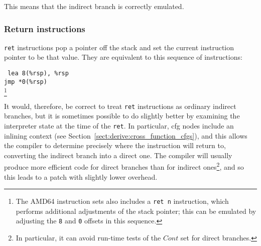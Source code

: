 This means that the indirect branch is correctly
emulated.




\subsubsection{Return instructions}

\texttt{ret} instructions pop a pointer off the stack and set the
current instruction pointer to be that value.  They are equivalent to
this sequence of instructions:

{\tt
lea 8(\%rsp), \%rsp\\
jmp *0(\%rsp)\\
}\footnote{The AMD64 instruction sets also includes a \texttt{ret n} instruction, which performs additional adjustments of the stack pointer; this can be emulated by adjusting the \texttt{8} and \texttt{0} offsets in this sequence.}

It would, therefore, be correct to treat \texttt{ret} instructions as
ordinary indirect branches, but it is sometimes possible to do
slightly better by examining the interpreter state at the time of the
\texttt{ret}.  In particular, \gls{cfg} nodes include an inlining context
(see Section~\ref{sect:derive:cross_function_cfgs}), and this allows
the compiler to determine precisely where the instruction will return
to, converting the indirect branch into a direct one.  The compiler
will usually produce more efficient code for direct branches than for
indirect ones\footnote{In particular, it can avoid run-time tests of
  the $\mathit{Cont}$ set for direct branches.}, and so this leads to
a patch with slightly lower overhead.


